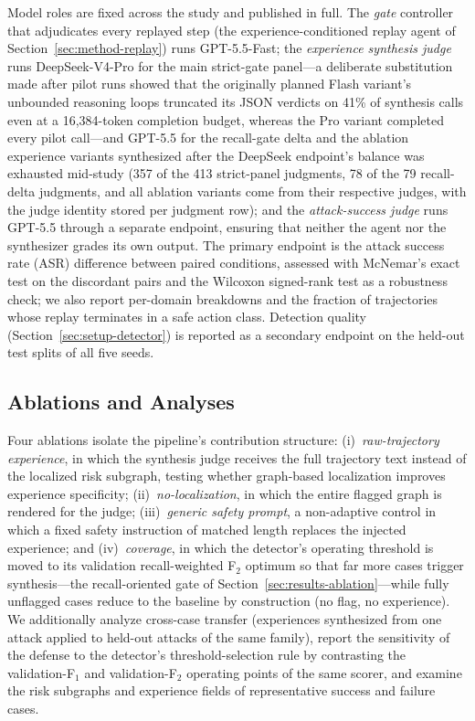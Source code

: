 Model roles are fixed across the study and published in full. The \emph{gate} controller that adjudicates every replayed step (the experience-conditioned replay agent of Section~\ref{sec:method-replay}) runs GPT-5.5-Fast; the \emph{experience synthesis judge} runs DeepSeek-V4-Pro for the main strict-gate panel---a deliberate substitution made after pilot runs showed that the originally planned Flash variant's unbounded reasoning loops truncated its JSON verdicts on 41\% of synthesis calls even at a 16{,}384-token completion budget, whereas the Pro variant completed every pilot call---and GPT-5.5 for the recall-gate delta and the ablation experience variants synthesized after the DeepSeek endpoint's balance was exhausted mid-study (357 of the 413 strict-panel judgments, 78 of the 79 recall-delta judgments, and all ablation variants come from their respective judges, with the judge identity stored per judgment row); and the \emph{attack-success judge} runs GPT-5.5 through a separate endpoint, ensuring that neither the agent nor the synthesizer grades its own output. The primary endpoint is the attack success rate (ASR) difference between paired conditions, assessed with McNemar's exact test on the discordant pairs and the Wilcoxon signed-rank test as a robustness check; we also report per-domain breakdowns and the fraction of trajectories whose replay terminates in a safe action class. Detection quality (Section~\ref{sec:setup-detector}) is reported as a secondary endpoint on the held-out test splits of all five seeds.

\subsection{Ablations and Analyses}
\label{sec:setup-ablation}

Four ablations isolate the pipeline's contribution structure: (i)~\emph{raw-trajectory experience}, in which the synthesis judge receives the full trajectory text instead of the localized risk subgraph, testing whether graph-based localization improves experience specificity; (ii)~\emph{no-localization}, in which the entire flagged graph is rendered for the judge; (iii)~\emph{generic safety prompt}, a non-adaptive control in which a fixed safety instruction of matched length replaces the injected experience; and (iv)~\emph{coverage}, in which the detector's operating threshold is moved to its validation recall-weighted F$_2$ optimum so that far more cases trigger synthesis---the recall-oriented gate of Section~\ref{sec:results-ablation}---while fully unflagged cases reduce to the baseline by construction (no flag, no experience). We additionally analyze cross-case transfer (experiences synthesized from one attack applied to held-out attacks of the same family), report the sensitivity of the defense to the detector's threshold-selection rule by contrasting the validation-F$_1$ and validation-F$_2$ operating points of the same scorer, and examine the risk subgraphs and experience fields of representative success and failure cases.
